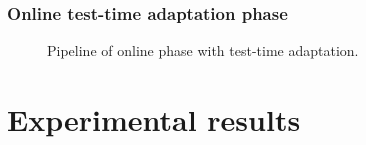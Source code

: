 \documentclass[aspectratio=169]{beamer}
\begin{document}
\begin{frame}
    \frametitle{Online test-time adaptation phase}
    \begin{figure}[H]
    \centering
    
    \caption[Online phase pipeline] {Pipeline of online phase with test-time adaptation.}
    \label{fig:online-phase}
    \end{figure}
\end{frame}

%     

%     

%     

% 

\section{Experimental results}
\end{document}
